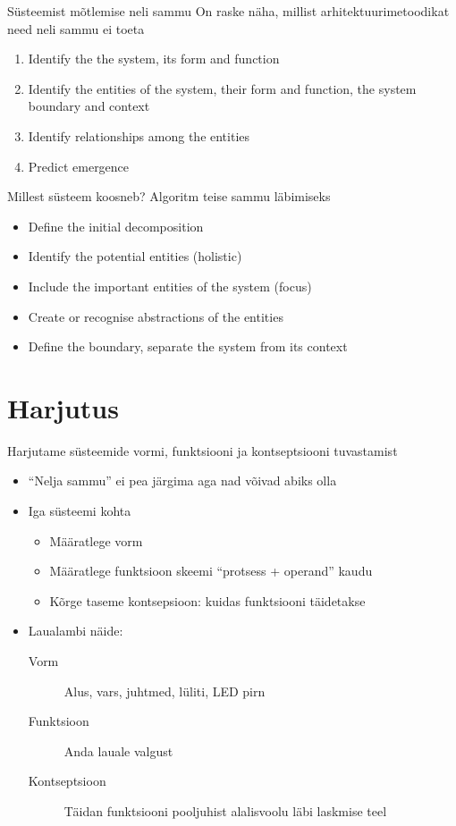 \documentclass{beamer}
\begin{document}
\begin{frame}{Süsteemist mõtlemise neli sammu}
 	On raske näha, millist arhitektuurimetoodikat need neli sammu ei toeta
	
		\begin{enumerate}
			\item Identify the the system, its form and function
			\item Identify the entities of the system, their form and function, the system boundary and context
			\item Identify relationships among the entities
			\item Predict emergence
		\end{enumerate}
\cite{crawley2015system}
\end{frame}


\begin{frame}{Millest süsteem koosneb?}
	Algoritm teise sammu läbimiseks
	
			\begin{itemize}
				\item Define the initial decomposition
				\item Identify the potential entities (holistic)
				\item Include the important entities of the system (focus)
				\item Create or recognise abstractions of the entities
				\item Define the boundary, separate the system from its context
			\end{itemize}
\cite{crawley2015system}
\end{frame}


\section{Harjutus}

\begin{frame}
	Harjutame süsteemide vormi, funktsiooni ja kontseptsiooni tuvastamist
	\begin{itemize}
		\item \enquote{Nelja sammu} ei pea järgima aga nad võivad abiks olla
		\item Iga süsteemi kohta
		\begin{itemize}
			\item Määratlege vorm
			\item Määratlege funktsioon skeemi \enquote{protsess + operand} kaudu
			\item Kõrge taseme kontsepsioon: kuidas funktsiooni täidetakse
		\end{itemize}
		\item Laualambi näide:
		\begin{description}
			\item[Vorm] Alus, vars, juhtmed, lüliti, LED pirn
			\item[Funktsioon] Anda lauale valgust
			\item[Kontseptsioon] Täidan funktsiooni pooljuhist alalisvoolu läbi laskmise teel
		\end{description}
	\end{itemize}
\end{frame}
\end{document}
